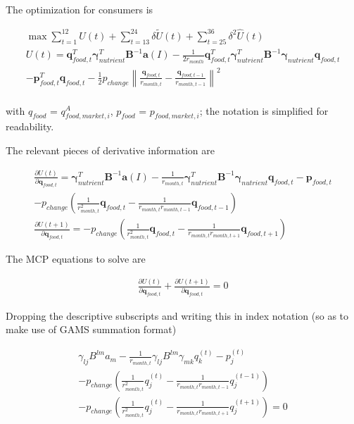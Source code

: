 \documentclass[letter,12pt]{article}
\begin{document}
The optimization for consumers is

\begin{gather}
\max \sum_{t=1}^{12} U\left(t\right) + \sum_{t=13}^{24} \delta \tilde{U}\left(t\right) + \sum_{t=25}^{36} \delta^2 \hat{U}\left(t\right) \\
U \left(t\right) = \mathbf{q}_{food,t}^T \boldsymbol \gamma_{nutrient}^T \mathbf{B}^{-1} \mathbf{a} \left(I\right) - \frac{1}{2r_{month}} \mathbf{q}_{food,t}^T \boldsymbol \gamma_{nutrient}^T \mathbf{B}^{-1} \boldsymbol \gamma_{nutrient} \mathbf{q}_{food,t} \nonumber \\ 
- \mathbf{p}_{food,t}^T \mathbf{q}_{food,t} - \frac{1}{2} p_{change} \left\|\frac{\mathbf{q}_{food,t}}{r_{month,t}} - \frac{\mathbf{q}_{food,t-1}}{r_{month,t-1}}\right\|^2 \\
\end{gather}

\noindent with $q_{food}$ = $q_{food,market,i}^A$, $p_{food}$ = $p_{food,market,i}$; the notation is simplified for readability.

The relevant pieces of derivative information are

\begin{gather}
\frac{\partial U \left(t\right)}{\partial \mathbf{q}_{food,t}} = \boldsymbol \gamma_{nutrient}^T \mathbf{B}^{-1} \mathbf{a} \left(I\right) - \frac{1}{r_{month,t}} \boldsymbol \gamma_{nutrient}^T \mathbf{B}^{-1} \boldsymbol \gamma_{nutrient} \mathbf{q}_{food,t} - \mathbf{p}_{food,t} \nonumber \\
- p_{change} \left( \frac{1}{r_{month,t}^2} \mathbf{q}_{food,t} - \frac{1}{r_{month,t} r_{month,t-1}} \mathbf{q}_{food,t-1} \right) \\
\frac{\partial U \left(t+1\right)}{\partial \mathbf{q}_{food,t}} = - p_{change} \left( \frac{1}{r_{month,t}^2} \mathbf{q}_{food,t} - \frac{1}{r_{month,t} r_{month,t+1}} \mathbf{q}_{food,t+1} \right)
\end{gather}


The MCP equations to solve are

\begin{gather}
\frac{\partial U \left(t\right)}{\partial \mathbf{q}_{food,t}} + \frac{\partial U \left(t+1\right)}{\partial \mathbf{q}_{food,t}} = 0
\end{gather}

Dropping the descriptive subscripts and writing this in index notation (so as to make use of GAMS summation format)

\begin{gather}
\gamma_{lj} B^{lm} a_m - \frac{1}{r_{month,t}} \gamma_{lj} B^{lm} \gamma_{mk} q_k^{\left(t\right)} - p_j^{\left(t\right)} \nonumber \\
- p_{change} \left( \frac{1}{r_{month,t}^2} q_j^{\left(t\right)} - \frac{1}{r_{month,t} r_{month,t-1}} q_j^{\left(t-1\right)}\right) \nonumber \\
- p_{change} \left( \frac{1}{r_{month,t}^2} q_j^{\left(t\right)} - \frac{1}{r_{month,t} r_{month,t+1}} q_j^{\left(t+1\right)} \right) = 0
\end{gather}
\end{document}

